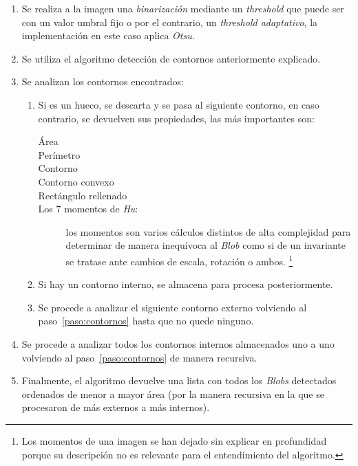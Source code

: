 \begin{enumerate}
\item Se realiza a la imagen una \emph{binarización} mediante un
  \emph{threshold} que puede ser con un valor umbral fijo o por el
  contrario, un \emph{threshold adaptativo}, la implementación en este
  caso aplica \emph{Otsu}.
\item Se utiliza el algoritmo detección de contornos anteriormente
  explicado.
\item Se analizan los contornos encontrados:
  \begin{enumerate}[label*=\arabic*.]
  \item\label{paso:contornos} Si es un hueco, se descarta y se pasa al siguiente contorno,
    en caso contrario, se devuelven sus propiedades, las más
    importantes son:
    \begin{description}
    \item[Área]
    \item[Perímetro]
    \item[Contorno]
    \item[Contorno convexo]
    \item[Rectángulo rellenado]
    \item[Los 7 momentos de \emph{Hu}:] los momentos son varios
      cálculos distintos de alta complejidad para determinar de manera
      inequívoca al \emph{Blob} como si de un invariante se tratase
      ante cambios de escala, rotación o ambos. \footnote{Los momentos
        de una imagen se han dejado sin explicar en profundidad porque
        su descripción no es relevante para el entendimiento del
        algoritmo.}
    \end{description}
  \item Si hay un contorno interno, se almacena para procesa
    posteriormente.
  \item Se procede a analizar el siguiente contorno externo volviendo
    al paso~\ref{paso:contornos} hasta que no quede ninguno.
  \end{enumerate}
\item Se procede a analizar todos los contornos internos almacenados
  uno a uno volviendo al paso~\ref{paso:contornos} de manera
  recursiva.
\item Finalmente, el algoritmo devuelve una lista con todos los
  \emph{Blobs} detectados ordenados de menor a mayor área (por la
  manera recursiva en la que se procesaron de más externos a más
  internos).
\end{enumerate}


